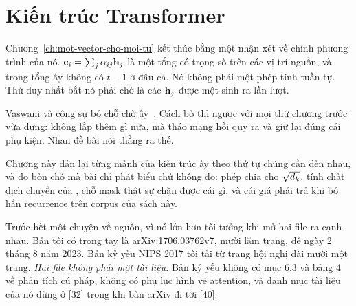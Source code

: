 \chapter{Kiến trúc Transformer}
\label{ch:transformer}

Chương~\ref{ch:mot-vector-cho-moi-tu} kết thúc bằng một nhận xét về chính
phương trình của nó. 
\(\mathbf{c}_i = \sum_j \alpha_{ij} \mathbf{h}_j\) là một tổng có trọng số trên các
vị trí nguồn, và trong tổng ấy không có \(t-1\) ở đâu cả. Nó không phải một
phép tính tuần tự. Thứ duy nhất bắt nó phải chờ là các \(\mathbf{h}_j\) được một
 sinh ra lần lượt.

Vaswani và cộng sự bỏ chỗ chờ ấy~\autocite{vaswani2017attention}. Cách bỏ thì
ngược với mọi thứ chương trước vừa dựng: không lắp thêm gì nữa, mà tháo mạng
hồi quy ra và giữ lại đúng cái phụ kiện. Nhan đề bài nói thẳng ra thế.

Chương này dẫn lại từng mảnh của kiến trúc ấy theo thứ tự chúng cần đến nhau, và
đo bốn chỗ mà bài chỉ phát biểu chứ không đo: phép chia cho \(\sqrt{d_{k}}\), tính
chất dịch chuyển của , chỗ mask thật sự
chặn được cái gì, và cái
giá phải trả khi bỏ hẳn recurrence trên corpus của sách này.

%
Trước hết một chuyện về nguồn, vì nó lớn hơn tôi tưởng khi mở hai file ra cạnh
nhau. Bản tôi có trong tay là arXiv:1706.03762v7, mười lăm trang, đề ngày 2
tháng 8 năm 2023. Bản kỷ yếu NIPS 2017 tôi tải từ trang hội nghị dài mười một
trang. \emph{Hai file không phải một tài liệu.} Bản kỷ yếu không có mục 6.3 và
bảng 4 về phân tích cú pháp, không có phụ lục hình vẽ attention, và danh mục
tài liệu của nó dừng ở [32] trong khi bản arXiv đi tới [40].

